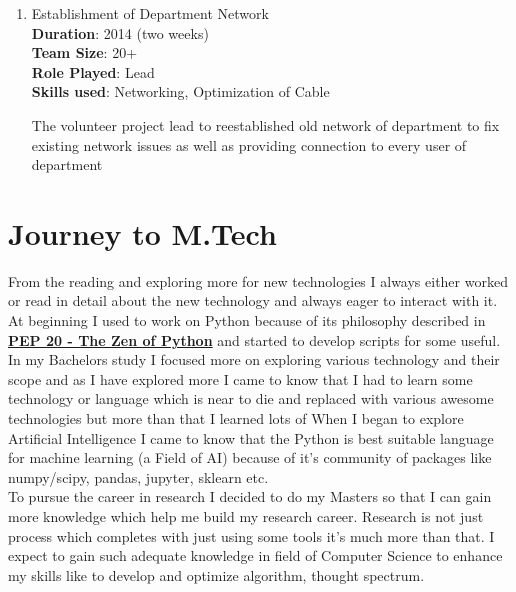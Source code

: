 \documentclass[a4paper, 14pt]{article}
\begin{document}
	
	\begin{enumerate}[start=1,label={\bfseries $\Rightarrow$ TITLE - }]
		\addtolength{\itemindent}{40pt}
		\item Establishment of Department Network
		\\ \textbf{Duration}: 2014 (two weeks)
		\\ \textbf{Team Size}: 20+
		\\ \textbf{Role Played}: Lead
		\\ \textbf{Skills used}:  Networking, Optimization of Cable
		
		The volunteer project lead to reestablished old network of department to fix existing network issues as well as providing connection to every user of department
	\end{enumerate}
	
	\newpage
	\section*{Journey to M.Tech}
	From the reading and exploring more for new technologies I always either worked or read in detail about the new technology and always eager to interact with it. \\
	
	At beginning I used to work on Python because of its philosophy described in \href{https://www.python.org/dev/peps/pep-0020/#the-zen-of-python}{\textbf{PEP 20 -  The Zen of Python}} and started to develop scripts for some useful. \\
	In my Bachelors study I focused more on exploring various technology and their scope and as I have explored more I came to know that I had to learn some technology or language which is near to die and replaced with various awesome technologies but more than that I learned lots of 
	When I began to explore Artificial Intelligence I came to know that the Python is best suitable language for machine learning (a Field of AI) because of it's community of packages like numpy/scipy, pandas, jupyter, sklearn etc. \\
	
	To pursue the career in research I decided to do my Masters so that I can gain more knowledge which help me build my research career. Research is not just  process which completes with just using some tools it's much more than that. I expect to gain such adequate knowledge in field of Computer Science to enhance my skills like to develop and optimize algorithm, thought spectrum.
	
\end{document}
